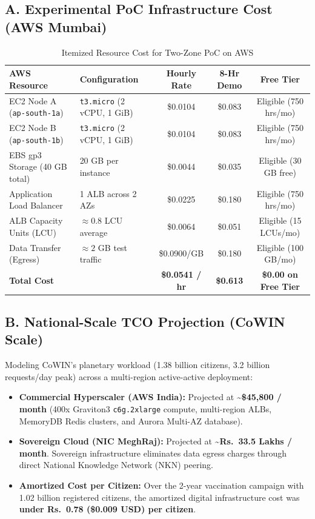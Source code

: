 \documentclass[11pt,a4paper]{article}
\begin{document}
\subsection*{A. Experimental PoC Infrastructure Cost (AWS Mumbai)}
\begin{table}[h]
\centering
\small
\begin{tabularx}{\textwidth}{@{}lYccc@{}}\toprule
\textbf{AWS Resource} & \textbf{Configuration} & \textbf{Hourly Rate} & \textbf{8-Hr Demo} & \textbf{Free Tier}\\\midrule
EC2 Node A (\texttt{ap-south-1a}) & \texttt{t3.micro} (2 vCPU, 1 GiB) & \$0.0104 & \$0.083 & Eligible (750 hrs/mo)\\
EC2 Node B (\texttt{ap-south-1b}) & \texttt{t3.micro} (2 vCPU, 1 GiB) & \$0.0104 & \$0.083 & Eligible (750 hrs/mo)\\
EBS gp3 Storage (40 GB total) & 20 GB per instance & \$0.0044 & \$0.035 & Eligible (30 GB free)\\
Application Load Balancer & 1 ALB across 2 AZs & \$0.0225 & \$0.180 & Eligible (750 hrs/mo)\\
ALB Capacity Units (LCU) & $\approx 0.8$ LCU average & \$0.0064 & \$0.051 & Eligible (15 LCUs/mo)\\
Data Transfer (Egress) & $\approx 2$ GB test traffic & \$0.0900/GB & \$0.180 & Eligible (100 GB/mo)\\\midrule
\textbf{Total Cost} & & \textbf{\$0.0541 / hr} & \textbf{\$0.613} & \textbf{\$0.00 on Free Tier}\\\bottomrule
\end{tabularx}
\caption{Itemized Resource Cost for Two-Zone PoC on AWS}
\end{table}

\subsection*{B. National-Scale TCO Projection (CoWIN Scale)}
Modeling CoWIN's planetary workload (1.38 billion citizens, 3.2 billion requests/day peak) across a multi-region active-active deployment:
\begin{itemize}
    \item \textbf{Commercial Hyperscaler (AWS India):} Projected at \textbf{\~{}\$45,800 / month} (400x Graviton3 \texttt{c6g.2xlarge} compute, multi-region ALBs, MemoryDB Redis clusters, and Aurora Multi-AZ database).
    \item \textbf{Sovereign Cloud (NIC MeghRaj):} Projected at \textbf{\~{}Rs.~33.5 Lakhs / month}. Sovereign infrastructure eliminates data egress charges through direct National Knowledge Network (NKN) peering.
    \item \textbf{Amortized Cost per Citizen:} Over the 2-year vaccination campaign with 1.02 billion registered citizens, the amortized digital infrastructure cost was \textbf{under Rs.~0.78 (\$0.009 USD) per citizen}.
\end{itemize}
\end{document}
